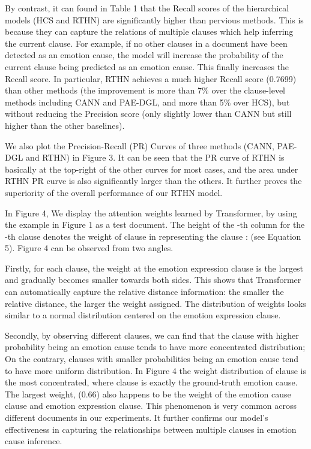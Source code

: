 \documentclass{article}
\begin{document}
By contrast, it can found in Table 1 that the Recall scores of the hierarchical models (HCS and RTHN) are significantly higher than pervious methods.  This is because they can capture the relations of multiple clauses which help inferring the current clause. For example, if no other clauses in a document have been detected as an emotion cause, the model will increase the probability of the current clause being predicted as an emotion cause. This finally increases the Recall score. In particular, RTHN achieves a much higher Recall score (0.7699) than other methods (the improvement is more than 7\% over the clause-level methods including CANN and PAE-DGL, and more than 5\% over HCS), but without reducing the Precision score (only slightly lower than CANN but still higher than the other baselines). 

We also plot the Precision-Recall (PR) Curves of three methods (CANN, PAE-DGL and RTHN) in Figure 3. It can be seen that the PR curve of RTHN is basically at the top-right of the other curves for most cases, and the area under RTHN PR curve is also significantly larger than the others. It further proves the superiority of the overall performance of our RTHN model.

In Figure 4, We display the attention weights learned by Transformer, by using the example in Figure 1 as a test document. The height of the -th column for the -th clause denotes the weight of clause  in representing the clause :  (see Equation 5). Figure 4 can be observed from two angles.

Firstly, for each clause, the weight at the emotion expression clause is the largest and gradually becomes smaller towards both sides. This shows that Transformer can automatically capture the relative distance information: the smaller the relative distance, the larger the weight assigned. The distribution of weights looks similar to a normal distribution centered on the emotion expression clause. 

Secondly, by observing different clauses, we can find that the clause with higher probability being an emotion cause tends to have more concentrated distribution; On the contrary, clauses with smaller probabilities being an emotion cause tend to have more uniform distribution. In Figure 4 the weight distribution of clause  is the most concentrated, where clause  is exactly the ground-truth emotion cause. The largest weight,  (0.66) also happens to be the weight of the emotion cause clause and emotion expression clause. This phenomenon is very common across different documents in our experiments. It further confirms our model's effectiveness in capturing the relationships between multiple clauses in emotion cause inference.
\end{document}

